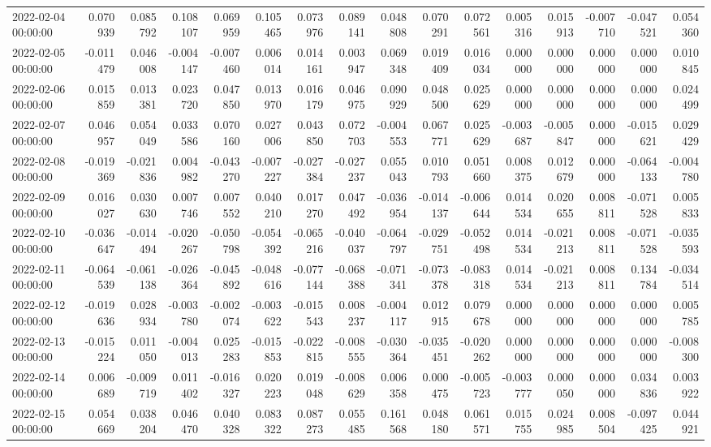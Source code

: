 \begin{tabular}{lrrrrrrrrrrrrrrr}
2022-02-04 00:00:00 & 0.070939 & 0.085792 & 0.108107 & 0.069959 & 0.105465 & 0.073976 & 0.089141 & 0.048808 & 0.070291 & 0.072561 & 0.005316 & 0.015913 & -0.007710 & -0.047521 & 0.054360 \\
2022-02-05 00:00:00 & -0.011479 & 0.046008 & -0.004147 & -0.007460 & 0.006014 & 0.014161 & 0.003947 & 0.069348 & 0.019409 & 0.016034 & 0.000000 & 0.000000 & 0.000000 & 0.000000 & 0.010845 \\
2022-02-06 00:00:00 & 0.015859 & 0.013381 & 0.023720 & 0.047850 & 0.013970 & 0.016179 & 0.046975 & 0.090929 & 0.048500 & 0.025629 & 0.000000 & 0.000000 & 0.000000 & 0.000000 & 0.024499 \\
2022-02-07 00:00:00 & 0.046957 & 0.054049 & 0.033586 & 0.070160 & 0.027006 & 0.043850 & 0.072703 & -0.004553 & 0.067771 & 0.025629 & -0.003687 & -0.005847 & 0.000000 & -0.015621 & 0.029429 \\
2022-02-08 00:00:00 & -0.019369 & -0.021836 & 0.004982 & -0.043270 & -0.007227 & -0.027384 & -0.027237 & 0.055043 & 0.010793 & 0.051660 & 0.008375 & 0.012679 & 0.000000 & -0.064133 & -0.004780 \\
2022-02-09 00:00:00 & 0.016027 & 0.030630 & 0.007746 & 0.007552 & 0.040210 & 0.017270 & 0.047492 & -0.036954 & -0.014137 & -0.006644 & 0.014534 & 0.020655 & 0.008811 & -0.071528 & 0.005833 \\
2022-02-10 00:00:00 & -0.036647 & -0.014494 & -0.020267 & -0.050798 & -0.054392 & -0.065216 & -0.040037 & -0.064797 & -0.029751 & -0.052498 & 0.014534 & -0.021213 & 0.008811 & -0.071528 & -0.035593 \\
2022-02-11 00:00:00 & -0.064539 & -0.061138 & -0.026364 & -0.045892 & -0.048616 & -0.077144 & -0.068388 & -0.071341 & -0.073378 & -0.083318 & 0.014534 & -0.021213 & 0.008811 & 0.134784 & -0.034514 \\
2022-02-12 00:00:00 & -0.019636 & 0.028934 & -0.003780 & -0.002074 & -0.003622 & -0.015543 & 0.008237 & -0.004117 & 0.012915 & 0.079678 & 0.000000 & 0.000000 & 0.000000 & 0.000000 & 0.005785 \\
2022-02-13 00:00:00 & -0.015224 & 0.011050 & -0.004013 & 0.025283 & -0.015853 & -0.022815 & -0.008555 & -0.030364 & -0.035451 & -0.020262 & 0.000000 & 0.000000 & 0.000000 & 0.000000 & -0.008300 \\
2022-02-14 00:00:00 & 0.006689 & -0.009719 & 0.011402 & -0.016327 & 0.020223 & 0.019048 & -0.008629 & 0.006358 & 0.000475 & -0.005723 & -0.003777 & 0.000050 & 0.000000 & 0.034836 & 0.003922 \\
2022-02-15 00:00:00 & 0.054669 & 0.038204 & 0.046470 & 0.040328 & 0.083322 & 0.087273 & 0.055485 & 0.161568 & 0.048180 & 0.061571 & 0.015755 & 0.024985 & 0.008504 & -0.097425 & 0.044921 \\

\end{tabular}

